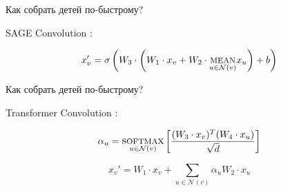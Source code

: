\documentclass[14pt,aspectratio=169,hyperref={pdftex,unicode},xcolor=dvipsnames]{beamer}
\newcommand{\fakesc}[1]{\uppercase{{\footnotesize #1}}}
\renewcommand{\textsc}{\fakesc}
\begin{document}
\begin{frame}{Как собрать детей по-быстрому?}

SAGE Convolution \cite{sage-conv-paper}:

\begin{equation*}
  x_v' = \sigma \left(W_3 \cdot \left(W_1 \cdot x_v + W_2 \cdot \underset{u \in \mathcal{N}(v)}{\text{\textsc{mean}}} x_u \right) + b \right)
\end{equation*}

\end{frame}



\begin{frame}{Как собрать детей по-быстрому?}

Transformer Convolution \cite{transformer-conv-paper}:

\begin{equation*}
  \alpha_{u} = \underset{u \in \mathcal{N}(v)}{\text{\textsc{softmax}}} \left[\frac{(W_3 \cdot x_v)^T (W_4 \cdot x_u)}{\sqrt d} \right]
\end{equation*}

\begin{equation*}
  x_v' = W_1 \cdot x_v + \sum_{u \in \mathcal{N}(v)} \alpha_u W_2 \cdot x_u
\end{equation*}

\end{frame}
\end{document}

